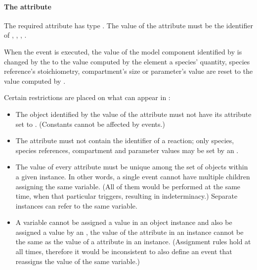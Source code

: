 \paragraph{The  attribute}

The \EventAssignment required attribute  has type . The value of the attribute must be the identifier of  \Compartment, \Species, \SpeciesReference,  \Parameter.  

When the event is executed, the value of
the model component identified by  is changed by
the \EventAssignment to the value computed by the 
element a species' quantity, species reference's
stoichiometry, compartment's size or parameter's value are reset
to the value computed by .

Certain restrictions are placed on what can appear in
:
\begin{itemize}
  
\item The object identified by the value of the 
  attribute must not have its  attribute set 
  to .  (Constants cannot be affected by events.)
  
\item The  attribute must not contain the
  identifier of a reaction;  only species, species references,
  compartment and parameter values may be set by an \Event.
  
\item The value of every  attribute must be unique
  among the set of \EventAssignment objects within a given
  \Event instance.  In other words, a single event cannot have
  multiple \EventAssignment children assigning the same variable.  (All
  of them would be performed at the same time, when that
  particular \Event triggers, resulting in indeterminacy.)
  Separate \Event instances can refer to the same variable.
  
\item A variable cannot be assigned a value in an \EventAssignment
  object instance and also be assigned a value by an
  \AssignmentRule, \ie the value of the  attribute
  in an \EventAssignment instance cannot be the same as the value
  of a  attribute in an \AssignmentRule instance.
  (Assignment rules hold at all times, therefore it would be
  inconsistent to also define an event that reassigns the value of
  the same variable.)

\end{itemize}

